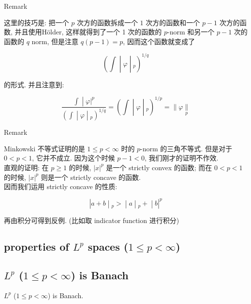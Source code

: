 \begin{qlremark}{Remark}

这里的技巧是: 把一个 \(p\) 次方的函数拆成一个 \(1\) 次方的函数和一个 \(p - 1\) 次方的函数, 并且使用Hölder, 这样就得到了一个 1 次的函数的 \(p\)-norm 和另一个 \(p - 1\) 次的函数的 \(q\) norm, 但是注意 \(q(p - 1) = p\), 因而这个函数就变成了

\[\left. (\int \middle| \varphi \middle| {}_{p})^{1/q} \right.\]

的形式. 并且注意到:

\[\left. \frac{\left. \int \middle| \varphi|^{p} \right.}{\left. (\int \middle| \varphi \middle| {}_{p})^{1/q} \right.} = (\int \middle| \varphi \middle| {}_{p})^{1/p} = \parallel \varphi\underset{p}{\parallel} \right.\]

\end{qlremark}

\begin{qlremark}{Remark}

Minkowski 不等式证明的是 \(1 \leq p < \infty\) 时的 \(p\)-norm 的三角不等式. 但是对于 \(0 < p < 1\), 它并不成立. 因为这个时候 \(p - 1 < 0\), 我们刚才的证明不作效.\\
直观的证明: 在 \(p \geq 1\) 的时候, \(|x|^{p}\) 是一个 strictly convex 的函数; 而在 \(0 < p < 1\) 的时候, \(|x|^{p}\) 则是一个 strictly concave 的函数.\\
因而我们运用 strictly concave 的性质:

\[\left. |a + b \middle| {}_{p} > \middle| a \middle| {}_{p} + \middle| b|^{p} \right.\]

再由积分可得到反例. (比如取 indicator function 进行积分)

\end{qlremark}

\subsection{\texorpdfstring{properties of \(L^{p}\) spaces (\(1 \leq p < \infty\))}{properties of L\^{}\{p\} spaces (1 \textbackslash leq p \textless{} \textbackslash infty)}}

\subsection{\texorpdfstring{\(L^{p}\) (\(1 \leq p < \infty\)) is Banach}{L\^{}\{p\} (1 \textbackslash leq p \textless{} \textbackslash infty) is Banach}}

\begin{theorem}{}

\(L^{p}\) (\(1 \leq p < \infty\)) is Banach.

\end{theorem}

